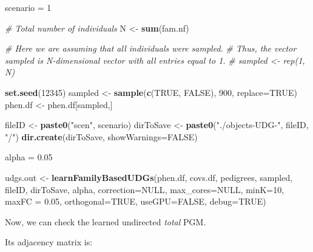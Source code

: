 \documentclass[]{article}
\newenvironment{Shaded}{\begin{snugshade}}{\end{snugshade}}
\newcommand{\KeywordTok}[1]{\textcolor[rgb]{0.13,0.29,0.53}{\textbf{#1}}}
\newcommand{\DataTypeTok}[1]{\textcolor[rgb]{0.13,0.29,0.53}{#1}}
\newcommand{\DecValTok}[1]{\textcolor[rgb]{0.00,0.00,0.81}{#1}}
\newcommand{\FloatTok}[1]{\textcolor[rgb]{0.00,0.00,0.81}{#1}}
\newcommand{\StringTok}[1]{\textcolor[rgb]{0.31,0.60,0.02}{#1}}
\newcommand{\CommentTok}[1]{\textcolor[rgb]{0.56,0.35,0.01}{\textit{#1}}}
\newcommand{\OtherTok}[1]{\textcolor[rgb]{0.56,0.35,0.01}{#1}}
\newcommand{\OperatorTok}[1]{\textcolor[rgb]{0.81,0.36,0.00}{\textbf{#1}}}
\newcommand{\NormalTok}[1]{#1}
\begin{document}
\begin{Shaded}
\begin{Highlighting}[]

\NormalTok{scenario =}\StringTok{ }\DecValTok{1}

\CommentTok{# Total number of individuals}
\NormalTok{N <-}\StringTok{ }\KeywordTok{sum}\NormalTok{(fam.nf) }

\CommentTok{# Here we are assuming that all individuals were sampled.}
\CommentTok{# Thus, the vector sampled is N-dimensional vector with all entries equal to 1.}
\CommentTok{# sampled <- rep(1, N) }

\KeywordTok{set.seed}\NormalTok{(}\DecValTok{12345}\NormalTok{)}
\NormalTok{sampled <-}\StringTok{ }\KeywordTok{sample}\NormalTok{(}\KeywordTok{c}\NormalTok{(}\OtherTok{TRUE}\NormalTok{, }\OtherTok{FALSE}\NormalTok{), }\DecValTok{900}\NormalTok{, }\DataTypeTok{replace=}\OtherTok{TRUE}\NormalTok{)}
\NormalTok{phen.df <-}\StringTok{ }\NormalTok{phen.df[sampled,]}
 
\NormalTok{fileID <-}\StringTok{ }\KeywordTok{paste0}\NormalTok{(}\StringTok{"scen"}\NormalTok{, scenario)}
\NormalTok{dirToSave <-}\StringTok{ }\KeywordTok{paste0}\NormalTok{(}\StringTok{"./objects-UDG-"}\NormalTok{, fileID, }\StringTok{"/"}\NormalTok{)}
\KeywordTok{dir.create}\NormalTok{(dirToSave, }\DataTypeTok{showWarnings=}\OtherTok{FALSE}\NormalTok{)}

\NormalTok{alpha =}\StringTok{ }\FloatTok{0.05}

\NormalTok{udgs.out <-}\StringTok{ }\KeywordTok{learnFamilyBasedUDGs}\NormalTok{(phen.df, covs.df, pedigrees, sampled, }
\NormalTok{                                 fileID, dirToSave, alpha, }\DataTypeTok{correction=}\OtherTok{NULL}\NormalTok{, }
                                 \DataTypeTok{max_cores=}\OtherTok{NULL}\NormalTok{, }\DataTypeTok{minK=}\DecValTok{10}\NormalTok{, }\DataTypeTok{maxFC =} \FloatTok{0.05}\NormalTok{,}
                                 \DataTypeTok{orthogonal=}\OtherTok{TRUE}\NormalTok{, }\DataTypeTok{useGPU=}\OtherTok{FALSE}\NormalTok{, }\DataTypeTok{debug=}\OtherTok{TRUE}\NormalTok{)}
\end{Highlighting}
\end{Shaded}

Now, we can check the learned undirected \emph{total} PGM.

Its adjacency matrix is:

\begin{Shaded}
\end{Shaded}
\end{document}
